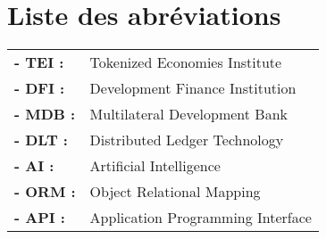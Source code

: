 \chapter*{Liste des abréviations}

\begin{tabular}{ll}
\textbf{- TEI :}& Tokenized Economies Institute \\[1mm]
\textbf{- DFI :}& Development Finance Institution \\[1mm]
\textbf{- MDB :}& Multilateral Development Bank \\[1mm]
\textbf{- DLT :}& Distributed Ledger Technology \\[1mm]
\textbf{- AI :}& Artificial Intelligence \\[1mm]
\textbf{- ORM :}& Object Relational Mapping \\[1mm]
\textbf{- API :}& Application Programming Interface \\
\end{tabular}

\clearpage
